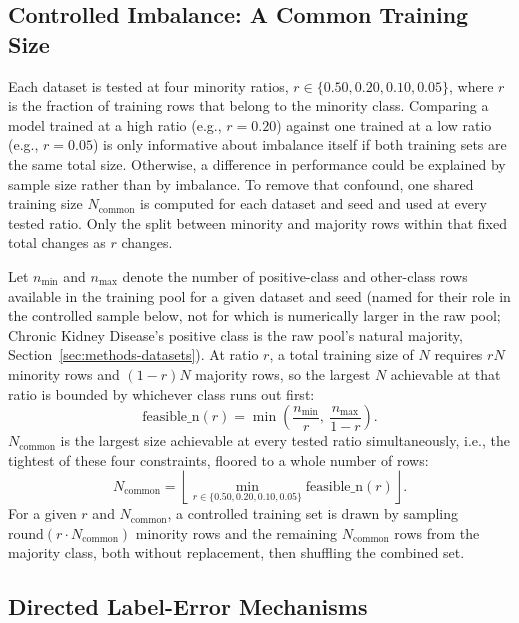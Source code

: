 \subsection{Controlled Imbalance: A Common Training Size}
\label{sec:methods-ncommon}

Each dataset is tested at four minority ratios, $r \in \{0.50, 0.20, 0.10,
0.05\}$, where $r$ is the fraction of training rows that belong to the
minority class. Comparing a model trained at a high ratio (e.g., $r{=}0.20$)
against one trained at a low ratio (e.g., $r{=}0.05$) is only informative
about imbalance itself if both training sets are the same total size.
Otherwise, a difference in performance could be explained by sample size
rather than by imbalance. To remove that confound, one shared training size
$N_{\text{common}}$ is computed for each dataset and seed and used at every
tested ratio. Only the split between minority and majority rows within that
fixed total changes as $r$ changes.

Let $n_{\min}$ and $n_{\max}$ denote the number of positive-class and
other-class rows available in the training pool for a given dataset and
seed (named for their role in the controlled sample below, not for which
is numerically larger in the raw pool; Chronic Kidney Disease's positive
class is the raw pool's natural majority, Section~\ref{sec:methods-datasets}).
At ratio $r$, a
total training size of $N$ requires $rN$ minority rows and $(1-r)N$ majority
rows, so the largest $N$ achievable at that ratio is bounded by whichever
class runs out first:
\begin{equation}
\text{feasible\_n}(r) = \min\!\left(\frac{n_{\min}}{r},\ \frac{n_{\max}}{1-r}\right).
\label{eq:feasible-n}
\end{equation}
$N_{\text{common}}$ is the largest size achievable at every tested ratio
simultaneously, i.e., the tightest of these four constraints, floored to a
whole number of rows:
\begin{equation}
N_{\text{common}} = \left\lfloor \min_{r \in \{0.50,0.20,0.10,0.05\}} \text{feasible\_n}(r) \right\rfloor.
\label{eq:ncommon}
\end{equation}
For a given $r$ and $N_{\text{common}}$, a controlled training set is drawn by
sampling $\text{round}(r \cdot N_{\text{common}})$ minority rows and the
remaining $N_{\text{common}}$ rows from the majority class, both without
replacement, then shuffling the combined set.

\subsection{Directed Label-Error Mechanisms}
\label{sec:methods-corruption}


